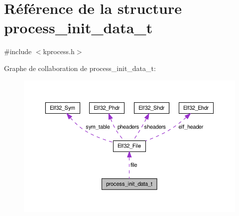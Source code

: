 \hypertarget{structprocess__init__data__t}{\section{Référence de la structure process\-\_\-init\-\_\-data\-\_\-t}
\label{structprocess__init__data__t}
}


{\ttfamily \#include $<$kprocess.\-h$>$}



Graphe de collaboration de process\-\_\-init\-\_\-data\-\_\-t\-:
\nopagebreak
\begin{figure}[H]
\begin{center}
\leavevmode
\includegraphics[width=350pt]{structprocess__init__data__t__coll__graph}
\end{center}
\end{figure}
